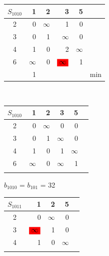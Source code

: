 \documentclass[12pt]{article}
\begin{document}
\begin{flushleft}
\begin{tabular}{c||rrrr||c}
$S_{1010}$ & 1 & 2 & 3 & 5 &  \\
\hline
\hline
2 & 0 & $\infty$ & 1  & 0 &  \\
3 & 0 & 1 & $\infty$  & 0 &  \\
4 & 1 & 0 & 2  & $\infty$ &  \\
6 & $\infty$ & 0 & $\colorbox{red}{$\infty$}$ & 1 &  \\
\hline
\hline
  &  1&  &  & &min \\
\end{tabular}
$\qquad $ 
\begin{tabular}{c||rrrr||c}
$S_{1010}$ & 1 & 2 & 3 & 5 &  \\
\hline
\hline
2 & 0 & $\infty$ & 0         & 0 &  \\
3 & 0 &        1 & $\infty$  & 0 &  \\
4 & 1 &        0 & 1         & $\infty$ &  \\
6 & $\infty$ & 0 & $\infty$  & 1 &  \\
\hline
\hline
     &  &  &  & \\
\end{tabular}
\end{flushleft}

$b_{1010}$ = $b_{101}$  = 32\\

\begin{flushleft}
\begin{tabular}{c||rrr||c}
$S_{1011}$ & 1 & 2  & 5 &  \\
\hline
\hline
2 & 0 & $\infty$   & 0 &  \\
3 & $\colorbox{red}{$\infty$}$ & 1   & 0 &  \\
4 & 1 & 0   & $\infty$ &  \\
\hline
\hline
  &  &  & \\
\end{tabular}
\end{flushleft}
\end{document}
